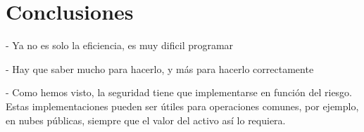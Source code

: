 \chapter{Conclusiones}

- Ya no es solo la eficiencia, es muy dificil programar

- Hay que saber mucho para hacerlo, y más para hacerlo correctamente \cite{peng_danger_2019}

- Como hemos visto, la seguridad tiene que implementarse en función del riesgo. Estas implementaciones pueden ser útiles para operaciones comunes, por ejemplo, en nubes públicas, siempre que el valor del activo así lo requiera.